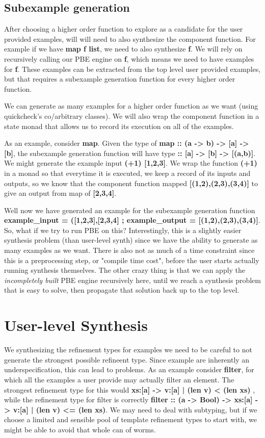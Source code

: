 \subsection{Subexample generation}
After choosing a higher order function to explore as a candidate for the user provided examples, will will need to also synthesize the component function.
For example if we have \textbf{map f list}, we need to also synthesize \textbf{f}.
We will rely on recursively calling our PBE engine on \textbf{f}, which means we need to have examples for \textbf{f}.
These examples can be extracted from the top level user provided examples, but that requires a subexample generation function for every higher order function.

We can generate as many examples for a higher order function as we want (using quickcheck's co/arbitrary classes).
We will also wrap the component function in a state monad that allows us to record its execution on all of the examples.

As an example, consider \textbf{map}.
Given the type of \textbf{map :: (a -> b) -> [a] -> [b]}, the subexample generation function will have type \textbf{:: [a] -> [b] -> [(a,b)]}.
We might generate the example input \textbf{(+1) [1,2,3]}.
We wrap the function \textbf{(+1)} in a monad so that everytime it is executed, we keep a record of its inputs and outputs, so we know that the component function mapped \textbf{[(1,2),(2,3),(3,4)]} to give an output from map of \textbf{[2,3,4]}.

Well now we have generated an example for the subexample generation function \textbf{example\_input = ([1,2,3],[2,3,4] ; example\_output = [(1,2),(2,3),(3,4)]}.
So, what if we try to run PBE on this? 
Interestingly, this is a slightly easier synthesis problem (than user-level synth) since we have the ability to generate as many examples as we want. 
There is also not as much of a time constraint since this is a preprocessing step, or "compile time cost", before the user starts actually running synthesis themselves. 
The other crazy thing is that we can apply the \textit{incompletely built} PBE engine recursively here, until we reach a synthesis problem that is easy to solve, then propagate that solution back up to the top level.

\section{User-level Synthesis}
We synthesizing the refinement types for examples we need to be careful to not generate the strongest possible refineent type.
Since example are inherently an underspecification, this can lead to problems.
As an example consider \textbf{filter}, for which all the examples a user provide may actually filter an element.
The strongest refinement type for this would  \textbf{xs:[a] -> {v:[a] | (len v) < (len xs)}} , while the refinement type for filter is correctly \textbf{filter :: (a -> Bool) -> xs:[a] -> {v:[a] | (len v) <= (len xs)}}.
We may need to deal with subtyping, but if we choose a limited and sensible pool of template refinement types to start with, we might be able to avoid that whole can of worms.  

